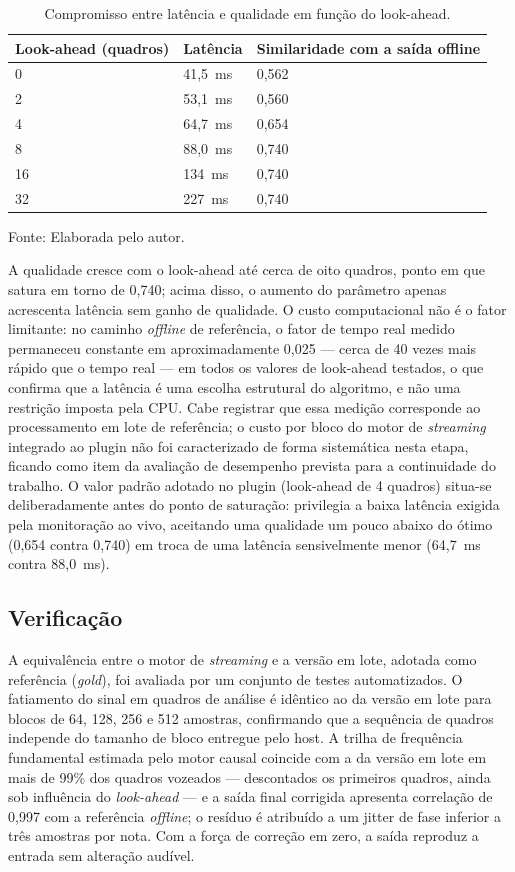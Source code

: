 \begin{table}[H]
\centering
\caption{\label{tab:sweep_lookahead}Compromisso entre latência e qualidade em função do look-ahead.}
\small
\begin{tabular}{|p{3.5cm}|p{3.0cm}|p{5.5cm}|}
\hline
\textbf{Look-ahead (quadros)} & \textbf{Latência} & \textbf{Similaridade com a saída offline} \\
\hline
0  & 41{,}5~ms & 0{,}562 \\
\hline
2  & 53{,}1~ms & 0{,}560 \\
\hline
4  & 64{,}7~ms & 0{,}654 \\
\hline
8  & 88{,}0~ms & 0{,}740 \\
\hline
16 & 134~ms    & 0{,}740 \\
\hline
32 & 227~ms    & 0{,}740 \\
\hline
\end{tabular}
\small Fonte: Elaborada pelo autor.
\end{table}

A qualidade cresce com o look-ahead até cerca de oito quadros, ponto em que satura em torno de 0{,}740; acima disso, o aumento do parâmetro apenas acrescenta latência sem ganho de qualidade. O custo computacional não é o fator limitante: no caminho \textit{offline} de referência, o fator de tempo real medido permaneceu constante em aproximadamente 0{,}025 --- cerca de 40 vezes mais rápido que o tempo real --- em todos os valores de look-ahead testados, o que confirma que a latência é uma escolha estrutural do algoritmo, e não uma restrição imposta pela CPU. Cabe registrar que essa medição corresponde ao processamento em lote de referência; o custo por bloco do motor de \textit{streaming} integrado ao plugin não foi caracterizado de forma sistemática nesta etapa, ficando como item da avaliação de desempenho prevista para a continuidade do trabalho. O valor padrão adotado no plugin (look-ahead de 4 quadros) situa-se deliberadamente antes do ponto de saturação: privilegia a baixa latência exigida pela monitoração ao vivo, aceitando uma qualidade um pouco abaixo do ótimo (0{,}654 contra 0{,}740) em troca de uma latência sensivelmente menor (64{,}7~ms contra 88{,}0~ms).

\subsection{Verificação}

A equivalência entre o motor de \textit{streaming} e a versão em lote, adotada como referência (\textit{gold}), foi avaliada por um conjunto de testes automatizados. O fatiamento do sinal em quadros de análise é idêntico ao da versão em lote para blocos de 64, 128, 256 e 512 amostras, confirmando que a sequência de quadros independe do tamanho de bloco entregue pelo host. A trilha de frequência fundamental estimada pelo motor causal coincide com a da versão em lote em mais de 99\% dos quadros vozeados --- descontados os primeiros quadros, ainda sob influência do \textit{look-ahead} --- e a saída final corrigida apresenta correlação de 0{,}997 com a referência \textit{offline}; o resíduo é atribuído a um jitter de fase inferior a três amostras por nota. Com a força de correção em zero, a saída reproduz a entrada sem alteração audível.

